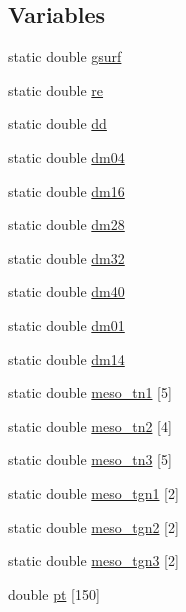 \subsection*{Variables}
\begin{DoxyCompactItemize}
\item 
static double \hyperlink{nrlmsise-00_8c_a9a778fbd1234a0e028c01268c7052111}{gsurf}
\item 
static double \hyperlink{nrlmsise-00_8c_a5a6fce2fc5cae153945fea2c45beeb4f}{re}
\item 
static double \hyperlink{nrlmsise-00_8c_ac47fb7efa6b9610bdc78116f1f94ec42}{dd}
\item 
static double \hyperlink{nrlmsise-00_8c_a88ca4eee7979d96378a848dc8d690194}{dm04}
\item 
static double \hyperlink{nrlmsise-00_8c_a31e4b27c95a4f7607ff83c5f6658baff}{dm16}
\item 
static double \hyperlink{nrlmsise-00_8c_a3d039f2243aa6c4c56d0f71faafe3a3f}{dm28}
\item 
static double \hyperlink{nrlmsise-00_8c_a90d87baf0902dd023cd60a544c9bd7d1}{dm32}
\item 
static double \hyperlink{nrlmsise-00_8c_afae9a0c814cddf6ce27b7fe8dffe57a7}{dm40}
\item 
static double \hyperlink{nrlmsise-00_8c_a3d331ddbf53b6b720388a221d01ffde5}{dm01}
\item 
static double \hyperlink{nrlmsise-00_8c_a7e634bc0af879e109efe029cabb7a681}{dm14}
\item 
static double \hyperlink{nrlmsise-00_8c_af1178fe9c91c432a2eb4f8bce487f122}{meso\+\_\+tn1} \mbox{[}5\mbox{]}
\item 
static double \hyperlink{nrlmsise-00_8c_a793989a4dd46c72a8f65b89d0416fe29}{meso\+\_\+tn2} \mbox{[}4\mbox{]}
\item 
static double \hyperlink{nrlmsise-00_8c_a54d193f8b08abc8f1dbc203dd86c8d96}{meso\+\_\+tn3} \mbox{[}5\mbox{]}
\item 
static double \hyperlink{nrlmsise-00_8c_a90f2ec0e8bf6a8b6972dde3026828773}{meso\+\_\+tgn1} \mbox{[}2\mbox{]}
\item 
static double \hyperlink{nrlmsise-00_8c_aff651e4d19dfbd75ce329f35ddbe9350}{meso\+\_\+tgn2} \mbox{[}2\mbox{]}
\item 
static double \hyperlink{nrlmsise-00_8c_a42cc3fd7704e724ee42bff5a7b646716}{meso\+\_\+tgn3} \mbox{[}2\mbox{]}
\item 
double \hyperlink{nrlmsise-00_8c_aa3caa9a62f4d69b33356c093e59da51f}{pt} \mbox{[}150\mbox{]}

\end{DoxyCompactItemize}
